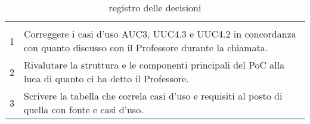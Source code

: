 \documentclass{article}
\begin{document}
\begin{table}[H]
  \centering
  \renewcommand{\arraystretch}{2}
  \begin{tabular}{c b{13cm}}
    \rowcolor{darkgray!90!}\color{white}{\textbf{Codice}} & \color{white}{\textbf{Decisione}}\\
    1 & Correggere i casi d'uso AUC3, UUC4.3 e UUC4.2 in concordanza con quanto discusso con il Professore durante la chiamata.\\
    2 & Rivalutare la struttura e le componenti principali del PoC alla luca di quanto ci ha detto il Professore. \\
    3 & Scrivere la tabella che correla casi d'uso e requisiti al posto di quella con fonte e casi d'uso.\\
  \end{tabular}
  \caption{registro delle decisioni}%
  \label{tab:registro delle decisioni}
\end{table}
\end{document}
